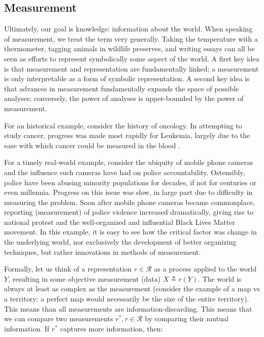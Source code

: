 \documentclass[12pt]{book}
\begin{document}
\subsection{Measurement}

Ultimately, our goal is knowledge: information about the world.
When speaking of measurement, we treat the term very generally. Taking the temperature with a thermometer, tagging animals in wildlife preserves, and writing essays can all be seen as efforts to represent symbolically some aspect of the world.
A first key idea is that measurement and representation are fundamentally linked; a measurement is only interpretable as a form of symbolic representation.
A second key idea is that advances in measurement fundamentally expands the space of possible analyses; conversely, the power of analyses is upper-bounded by the power of measurement.

For an historical example, consider the history of oncology.
In attempting to study cancer, progress was made most rapidly for Leukemia, largely due to the ease with which cancer could be measured in the blood \cite{mukherjee}.

For a timely real-world example, consider the ubiquity of mobile phone cameras and the influence such cameras have had on police accountability.
Ostensibly, police have been abusing minority populations for decades, if not for centuries or even millennia.
Progress on this issue was slow, in large part due to difficulty in measuring the problem.
Soon after mobile phone cameras became commonplace, reporting (measurement) of police violence increased dramatically, giving rise to national protest and the well-organized and influential Black Lives Matter movement.
In this example, it is easy to see how the critical factor was change in the underlying world, nor exclusively the development of better organizing techniques, but rather innovations in methods of measurement.

\bigskip

Formally, let us think of a representation $r \in \mathcal{R}$ as a process applied to the world $Y$, resulting in some objective measurement (data) $X \triangleq r(Y)$.
The world is always at least as complex as the measurement (consider the example of a map vs a territory: a perfect map would necessarily be the size of the entire territory).
This means than all measurements are information-discarding.
This means that we can compare two measurements $r^*, r \in \mathcal{R}$ by comparing their mutual information.
If $r^*$ captures more information, then:
\end{document}
